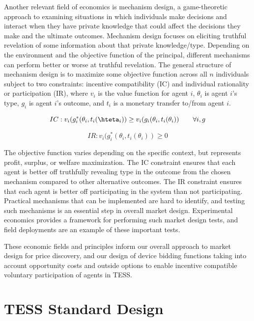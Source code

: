\documentclass[12pt]{article}{Definitions/mdpi}
\begin{document}
Another relevant field of economics is mechanism design, a game-theoretic approach to examining situations in which individuals make decisions and interact when they have private knowledge that could affect the decisions they make and the ultimate outcomes. Mechanism design focuses on eliciting truthful revelation of some information about that private knowledge/type. Depending on the environment and the objective function of the principal, different mechanisms can perform better or worse at truthful revelation.
The general structure of mechanism design is to maximize some objective function across all $n$ individuals subject to two constraints: incentive compatibility (IC) and individual rationality or participation (IR), where $v_i$ is the value function for agent $i$, $\theta_i$ is agent $i$'s type, $g_i$ is agent $i$'s outcome, and $t_i$ is a monetary transfer to/from agent $i$.

\begin{equation}
IC: 	v_i(g^*_i(\theta_i,t_i(\hteta_i)) \geq v_i(g_i(\theta_i,t_i(\theta_i)) \qquad \forall i,g
\end{equation}

\begin{equation}
IR:	    v_i(g^*_i(\theta_i,t_i(\theta_i)) \geq 0
\end{equation}

The objective function varies depending on the specific context, but represents profit, surplus, or welfare maximization. The IC constraint ensures that each agent is better off truthfully revealing type in the outcome from the chosen mechanism compared to other alternative outcomes. The IR constraint ensures that each agent is better off participating in the system than not participating. 
Practical mechanisms that can be implemented are hard to identify, and testing such mechanisms is an essential step in overall market design. Experimental economics provides a framework for performing such market design tests, and field deployments are an example of these important tests.

These economic fields and principles inform our overall approach to market design for price discovery, and our design of device bidding functions taking into account opportunity costs and outside options to enable incentive compatible voluntary participation of agents in TESS.

\section{TESS Standard Design}\label{sec:standard_design}
\end{document}

